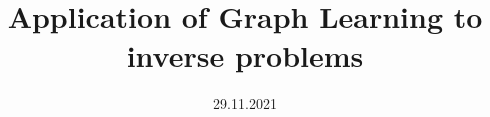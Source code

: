 \documentclass[a4paper, 10pt, oneside]{memoir}
\title				{Application of Graph Learning to inverse problems}
\date				{29.11.2021}
\begin{document}

\thesisfront
\maketitle
\pagestyle{thesis}
% 
%
\thesistoc
\thesismain

%




%

%


\thesisbib
\begin{appendices}
	 
\end{appendices}
\end{document}
